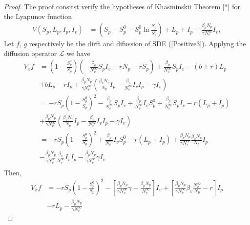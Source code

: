 %
\begin{proof}
		The proof consitst verify the hypotheses of Khasminskii Theorem [*] 
	for  the Lyapunov function
	\begin{align*}
		V(S_p,L_p,I_p,I_v) &= 
			\left(
				S_p - S_p^0 -  S_p^0 
				\ln 
				\frac{S_p}{S_p^0}
			\right) + 
			L_p + 
			I_p + 
			\frac{\beta_p N_p}{\gamma N^\infty_v}I_v,
	\end{align*}
	Let $f$, 
	$g$ respectively be the dirft and difussion of SDE (\ref{Positive3}).	
	Applyng the diffusion operator $\mathcal{L}$ we have
	\begin{align*}
		V_x f &=
			\left(
				1-\frac{S_p^0}{S_p}
			\right)
			\left(
				-\frac{\beta_p}{N ^ \infty_v} S_pI_v + 
				r N_p - r S_p
			\right) + 
			\frac{\beta_p}{N^\infty_v} S_p I_v - 
			(b + r) L_p
			\\
			  &+
				b L_p - rI_p + 
				\frac{\beta_p N_p}{\gamma N ^ \infty_v}
				\left(
					\frac{\beta_v N_v}{N_p}I_p - 
					\frac{\beta_v}{N_v^\infty} I_vI_p - 
					\gamma I_v
				\right)
			\\
			  &=
			  	-rS_p 
			  	\left(
			  		1 - \frac{S_p^0}{S_p}
			  	\right) ^2 -
			  	\frac{\beta_p}{N_v ^ \infty} S_pI_v +
			  	\frac{\beta_p}{N_v ^ \infty} I_vS_p ^ 0 + 
			  	\frac{\beta_p}{N_v ^ \infty} S_pI_v - 
			  	r(L_p + I_p)
			\\
			  &+
			  	\frac{\beta_p N_p}{\gamma N ^ \infty_v}
			  	\left(
			  		\frac{\beta_v N_v}{N_p}I_p - 
			  		\frac{\beta_v}{N_v^\infty} I_vI_p -
			  		\gamma I_v
			  	\right)
			\\
			  &=
			  	-r S_p 
			  	\left(
			  		1 - 
			  		\frac{S_p^0}{S_p}
			  	\right) ^ 2 + 
			  	\frac{\beta_p}{N_v^\infty} I_v S_p ^ 0 - 
			  	r (L_p + I_p) + 
			  	\frac{\beta_p N_p}{\gamma N ^ \infty_v}
			  	\frac{\beta_v N_v}{N_p}I_p
			\\
			  &-	
			  	\frac{\beta_p N_p}{\gamma N ^ \infty_v}
			  	\frac{\beta_v}{N_v ^ \infty} I_vI_p - 
			  	\frac{\beta_p N_p}{\gamma N ^ \infty_v} \gamma I_v
			\\
	\end{align*}
	Then,
	\begin{align*}
		V_x f &=
			-r S_p
			\left(
				1 - \frac{S_p^0}{S_p}
			\right) ^ 2 - 
			\left[
				\frac{\beta_p N_p}{\gamma N^\infty_v}
				\gamma - 
				\frac{\beta_p N_p}{N_v^\infty}
			\right] I_v + 
			\left[
				\frac{\beta_p N_p}{\gamma N^\infty_v}
				\beta_v 
				\frac{N_v^\infty}{N_p} - r
			\right]I_p
		\\
			&-
			r L_p - 
			\frac{\beta_p N_p}{\gamma N ^ \infty_v}

\end{align*}
\end{proof}
